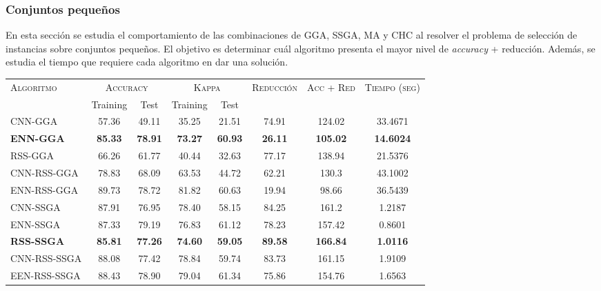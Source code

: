 \subsubsection{Conjuntos pequeños}

En esta sección se estudia el comportamiento de las combinaciones de GGA, SSGA, MA y CHC al resolver el problema de selección de instancias sobre conjuntos pequeños. El objetivo es determinar cuál algoritmo presenta el mayor nivel de \emph{accuracy} + reducción. Además, se estudia el tiempo que requiere cada algoritmo en dar una solución.


\begin{table}[h!]
\centering
\begin{adjustbox}{max width =\textwidth}
\begin{tabular}{l c c c c c c c}
\hline
\multirow{2}{*}{\textsc{Algoritmo}}
	& \multicolumn{2}{c}{\textsc{Accuracy}}
	& \multicolumn{2}{c}{\textsc{Kappa}}
	& \textsc{Reducción}
	& \textsc{Acc + Red}
	& \textsc{Tiempo (seg)} \\
	& Training & Test
	& Training & Test \\ 
\hline
\hline

CNN-GGA     & 57.36 & 49.11 & 35.25 & 21.51 & 74.91 & 124.02 & 33.4671 \\
\textbf{ENN-GGA}     & \textbf{85.33} & \textbf{78.91} & \textbf{73.27} & \textbf{60.93} & \textbf{26.11} & \textbf{105.02} & \textbf{14.6024} \\
RSS-GGA     & 66.26 & 61.77 & 40.44 & 32.63 & 77.17 & 138.94 & 21.5376 \\
CNN-RSS-GGA & 78.83 & 68.09 & 63.53 & 44.72 & 62.21 & 130.3 & 43.1002 \\
ENN-RSS-GGA & 89.73 & 78.72 & 81.82 & 60.63 & 19.94 & 98.66 & 36.5439 \\

\hline

CNN-SSGA & 87.91 & 76.95 & 78.40 & 58.15 & 84.25 & 161.2 & 1.2187 \\
ENN-SSGA & 87.33 & 79.19 & 76.83 & 61.12 & 78.23 & 157.42 & 0.8601 \\
\textbf{RSS-SSGA} & \textbf{85.81} & \textbf{77.26} & \textbf{74.60} & \textbf{59.05} & \textbf{89.58} & \textbf{166.84} &\textbf{1.0116} \\
CNN-RSS-SSGA & 88.08 & 77.42 & 78.84 & 59.74 & 83.73 & 161.15 & 1.9109 \\
EEN-RSS-SSGA & 88.43 & 78.90 & 79.04 & 61.34 & 75.86 & 154.76 & 1.6563 \\


\end{tabular}
\end{adjustbox}
\end{table}
